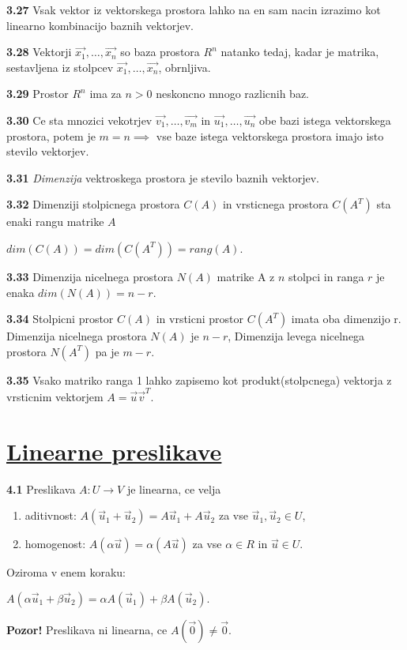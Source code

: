 \documentclass{article}
\begin{document}
\begin{multicols}{4}
\textbf{3.27} Vsak vektor iz vektorskega prostora lahko na en sam nacin izrazimo
kot linearno kombinacijo baznih vektorjev.
 
\textbf{3.28} Vektorji $\vec{x_{1}}, \dots,\vec{x_{n}}$ so baza prostora $R^{n}$ natanko tedaj, kadar 
je matrika, sestavljena iz stolpcev $\vec{x_{1}}, \dots,\vec{x_{n}}$, obrnljiva.

\textbf{3.29} Prostor $R^{n}$ ima za $n > 0$ neskoncno mnogo razlicnih baz.

\textbf{3.30} Ce sta mnozici vekotrjev {$\vec{v_{1}}, \dots,\vec{v_{m}}$} in $\vec{u_{1}}, \dots,\vec{u_{n}}$
obe bazi istega vektorskega prostora, potem je $m = n \implies$ vse baze istega vektorskega prostora imajo
isto stevilo vektorjev.

\textbf{3.31} \textit{Dimenzija} vektroskega prostora je stevilo baznih vektorjev.

\textbf{3.32} Dimenziji stolpicnega prostora $C(A)$ in vrsticnega prostora $C(A^{T})$ sta enaki rangu matrike $A$
\begin{center}
    $dim(C(A)) = dim(C(A^{T})) = rang(A)$.
\end{center}

\textbf{3.33} Dimenzija nicelnega prostora $N(A)$ matrike A z $n$ stolpci in ranga $r$
je enaka $dim(N(A)) = n - r$.

\textbf{3.34} Stolpicni prostor $C(A)$ in vrsticni prostor $C(A^{T})$ imata oba dimenzijo r. Dimenzija
nicelnega prostora $N(A)$ je $n -r$, Dimenzija levega nicelnega prostora $N(A^{T})$ pa je $m - r$.

\textbf{3.35} Vsako matriko ranga 1 lahko zapisemo kot produkt(stolpcnega) vektorja z vrsticnim
vektorjem $A = \vec{u}\vec{v}^{T}$.

\section{\underline{Linearne preslikave}}

\textbf{4.1} Preslikava $A: U \rightarrow V$ je linearna, ce velja
\begin{enumerate}
    \item aditivnost: $A(\vec{u}_{1} + \vec{u}_{2}) = A\vec{u}_{1} + A\vec{u}_{2}$ za vse $\vec{u}_{1}, \vec{u}_{2} \in U$,
    \item homogenost: $A(\alpha \vec{u}) = \alpha(A\vec{u})$ za vse $\alpha \in R$ in $\vec{u} \in U$.
\end{enumerate}
Oziroma v enem koraku:
\begin{center}
    \begin{math}
        A(\alpha\vec{u}_{1} + \beta\vec{u}_{2}) = \alpha A(\vec{u}_{1}) + \beta A(\vec{u}_{2}).
    \end{math}
\end{center}
\textbf{Pozor!} Preslikava ni linearna, ce $A(\vec{0}) \neq  \vec{0}$.


\end{multicols}
\end{document}
